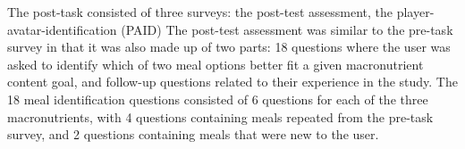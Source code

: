 The post-task consisted of three surveys: the post-test assessment, the player-avatar-identification (PAID) 
The post-test assessment was similar to the pre-task survey in that it was also made up of two parts: 18 questions where the user was asked to identify which of two meal options better fit a given macronutrient content goal, and follow-up questions related to their experience in the study. 
The 18 meal identification questions consisted of 6 questions for each of the three macronutrients, with 4 questions containing meals repeated from the pre-task survey, and 2 questions containing meals that were new to the user. 
